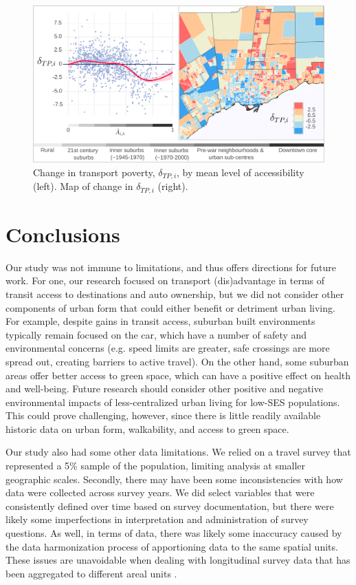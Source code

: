 \begin{figure}[H]
	
	\centering
	
	
	\hspace*{-0.333in}
	\includegraphics[width=6.5in]{figures/Fig5}
	
	
	\caption{{Change in transport poverty, $\delta_{TP,i}$, by mean level of accessibility (left). Map of change in $\delta_{TP,i}$ (right).}}
	\label{fig:tpov}
\end{figure}



\section{Conclusions}

Our study was not immune to limitations, and thus offers directions for future work. For one, our research focused on transport (dis)advantage in terms of transit access to destinations and auto ownership, but we did not consider other components of urban form that could either benefit or detriment urban living. For example, despite gains in transit access, suburban built environments typically remain focused on the car, which have a number of safety and environmental concerns (e.g. speed limits are greater, safe crossings are more spread out, creating barriers to active travel). On the other hand, some suburban areas offer better access to green space, which can have a positive effect on health and well-being. Future research should consider other positive and negative environmental impacts of less-centralized urban living for low-SES populations. This could prove challenging, however, since there is little readily available historic data on urban form, walkability, and access to green space.

Our study also had some other data limitations. We relied on a travel survey that represented a 5\% sample of the population, limiting analysis at smaller geographic scales. Secondly, there may have been some inconsistencies with how data were collected across survey years. We did select variables that were consistently defined over time based on survey documentation, but there were likely some imperfections in interpretation and administration of survey questions. As well, in terms of data, there was likely some inaccuracy caused by the data harmonization process of apportioning data to the same spatial units. These issues are unavoidable when dealing with longitudinal survey data that has been aggregated to different areal units \cite{allen_new_2018}. 

